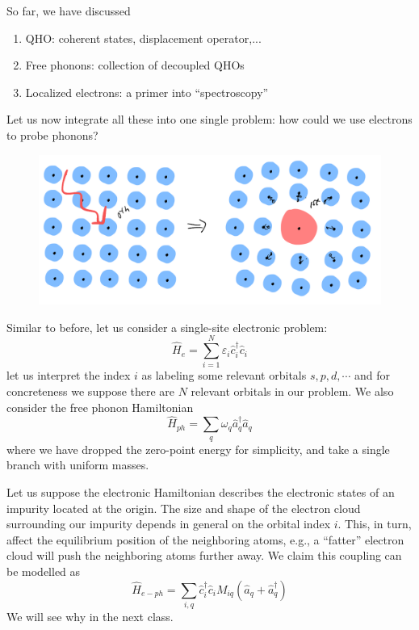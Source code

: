 So far, we have discussed
\begin{enumerate}
    \item QHO: coherent states, displacement operator,...
    \item Free phonons: collection of decoupled QHOs
    \item Localized electrons: a primer into ``spectroscopy''
\end{enumerate}
Let us now integrate all these into one single problem: how could we use electrons to probe phonons?

\begin{figure}[ht]
    \centering
    \includegraphics[width=\textwidth]{jupyterbook/data/fig/lec05-fig10.png}
\end{figure}

Similar to before, let us consider a single-site electronic problem:
\[ \hat{H}_e=\sum_{i=1}^N{\varepsilon _i\hat{c}_{i}^{\dagger}\hat{c}_i}\]
let us interpret the index $i$ as labeling some relevant orbitals $s,p,d,\cdots$ and for concreteness we suppose there are $N$ relevant orbitals in our problem. We also consider the free phonon Hamiltonian
\[ \hat{H}_{ph}=\sum_q{\omega _q\hat{a}_{q}^{\dagger}\hat{a}_q}\]
where we have dropped the zero-point energy for simplicity, and take a single branch with uniform masses.

Let us suppose the electronic Hamiltonian describes the electronic states of an impurity located at the origin. The size and shape of the electron cloud surrounding our impurity depends in general on the orbital index $i$. This, in turn, affect the equilibrium position of the neighboring atoms, e.g., a ``fatter'' electron cloud will push the neighboring atoms further away. We claim this coupling can be modelled as
\[ \hat{H}_{e-ph}=\sum_{i,q}{\hat{c}_{i}^{\dagger}\hat{c}_iM_{iq}\left( \hat{a}_q+\hat{a}_{q}^{\dagger} \right)}\]
We will see why in the next class.
